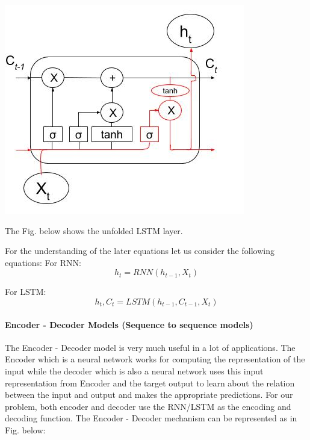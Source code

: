 				\begin{center}
				\includegraphics[width=\linewidth]{figures/output-gate.jpg}	
				\label{fig: Output Gate}
				\end{center}

The Fig. below shows the unfolded LSTM layer.

For the understanding of the later equations let us consider the following equations:
For RNN: \begin{equation} h_{t} = RNN(h_{t-1}, X_{t}) \end{equation}

For LSTM: \begin{equation} h_{t}, C_{t} = LSTM(h_{t-1}, C_{t-1}, X_{t}) \end{equation} 

\paragraph{Encoder - Decoder Models (Sequence to sequence models)}

The Encoder - Decoder model is very much useful in a lot of applications. The Encoder which is a neural network works for computing the representation of the input while the decoder which is also a neural network uses this input representation from Encoder and the target output to learn about the relation between the input and output and makes the appropriate predictions. For our problem, both encoder and decoder use the RNN/LSTM as the encoding and decoding function. The Encoder - Decoder mechanism can be represented as in Fig. below:

